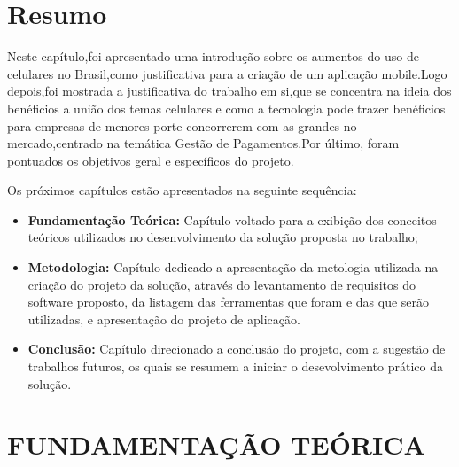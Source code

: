 \documentclass[a4paper,12pt]{article}
\begin{document}
\section*{Resumo}

\hspace{0.5cm}Neste capítulo,foi apresentado uma introdução sobre os aumentos do uso de celulares no Brasil,como justificativa para a criação de um aplicação mobile.Logo depois,foi mostrada a justificativa do trabalho em si,que se concentra na ideia dos benéficios a união  dos temas celulares e como a tecnologia pode trazer benéficios para empresas de menores porte concorrerem com as grandes no mercado,centrado na temática Gestão de Pagamentos.Por
último, foram pontuados os objetivos geral e específicos do projeto.

\hspace{0.5cm}Os próximos capítulos estão apresentados na seguinte sequência:
\begin{itemize}
    \item \textbf{Fundamentação Teórica:} Capítulo voltado para a exibição dos conceitos teóricos
          utilizados no desenvolvimento da solução proposta no trabalho;
    \item \textbf{Metodologia:} Capítulo dedicado a apresentação da metologia utilizada na criação
          do projeto da solução, através do levantamento de requisitos do software proposto,
          da listagem das ferramentas que foram e das que serão utilizadas, e apresentação do
          projeto de aplicação.
    \item \textbf{Conclusão:} Capítulo direcionado a conclusão do projeto, com a sugestão de trabalhos
          futuros, os quais se resumem a iniciar o desevolvimento prático da solução.
\end{itemize}
\newpage

\section{FUNDAMENTAÇÃO TEÓRICA}
\end{document}
